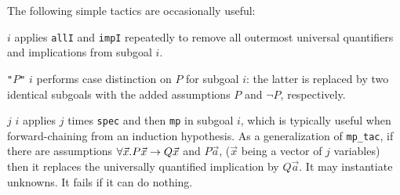 The following simple tactics are occasionally useful:
\begin{ttdescription}
\item[\ttindexbold{strip_tac} $i$] applies \texttt{allI} and \texttt{impI}
  repeatedly to remove all outermost universal quantifiers and implications
  from subgoal $i$.
\item[\ttindexbold{case_tac} {\tt"}$P${\tt"} $i$] performs case distinction
  on $P$ for subgoal $i$: the latter is replaced by two identical subgoals
  with the added assumptions $P$ and $\lnot P$, respectively.
\item[\ttindexbold{smp_tac} $j$ $i$] applies $j$ times \texttt{spec} and then
  \texttt{mp} in subgoal $i$, which is typically useful when forward-chaining 
  from an induction hypothesis. As a generalization of \texttt{mp_tac}, 
  if there are assumptions $\forall \vec{x}. P \vec{x} \rightarrow Q \vec{x}$ and 
  $P \vec{a}$, ($\vec{x}$ being a vector of $j$ variables)
  then it replaces the universally quantified implication by $Q \vec{a}$. 
  It may instantiate unknowns. It fails if it can do nothing.
\end{ttdescription}



